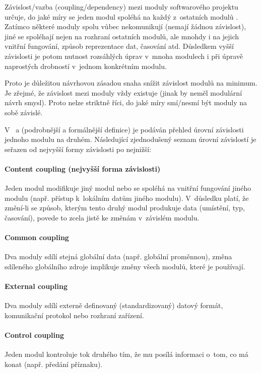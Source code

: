 Závislost/vazba (coupling/dependency) mezi moduly softwarového projektu určuje, do jaké míry se jeden modul spoléhá na každý z~ostatních modulů \cite{wiki:coupling}. Zatímco některé moduly spolu vůbec nekomunikují (nemají žádnou závislost), jiné se spoléhají nejen na rozhraní ostatních modulů, ale mnohdy i na jejich vnitřní fungování, způsob reprezentace dat, časování atd. Důsledkem vyšší závislosti je potom nutnost rozsáhlých úprav v~mnoha modulech i při úpravě naprostých drobností v~jednom konkrétním modulu.

Proto je důležitou návrhovou zásadou snaha snížit závislost modulů na minimum. Je zřejmé, že závislost mezi moduly vždy existuje (jinak by neměl modulární návrh smysl). Proto nelze striktně říci, do jaké míry smí/nesmí být moduly na sobě závislé.

V~\cite{wiki:coupling} a \cite{STVR:STVR162} (podrobnější a formálnější definice) je podáván přehled úrovní závislosti jednoho modulu na druhém. Následující zjednodušený seznam úrovní závislostí je seřazen od nejvyšší formy závislosti po nejnižší:

\paragraph{Content coupling (nejvyšší forma závislosti)} Jeden modul modifikuje jiný modul nebo se spoléhá na vnitřní fungování jiného modulu (např. přístup k~lokálním datům jiného modulu). V~důsledku platí, že změní-li se způsob, kterým tento druhý modul produkuje data (umístění, typ, časování), povede to zcela jistě ke změnám v~závislém modulu.

\paragraph{Common coupling} Dva moduly sdílí stejná globální data (např. globální proměnnou), změna sdíleného globálního zdroje implikuje změny všech modulů, které je používají.

\paragraph{External coupling} Dva moduly sdílí externě definovaný (standardizovaný) datový formát, komunikační protokol nebo rozhraní zařízení.

\paragraph{Control coupling} Jeden modul kontroluje tok druhého tím, že mu posílá informaci o~tom, co má konat (např. předání  příznaku).

